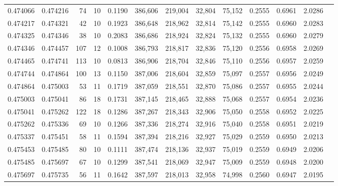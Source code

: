 \begin{tabular}{rrrrrrrrrrrrr}
0.474066 & 0.474216 &    74 &  10 &                                     0.1190 & 386,606 & 219,004 &  32,804 &  75,152 & 0.2555 & 0.6961 & 2.0286 \\
0.474217 & 0.474321 &    42 &  10 &                                     0.1923 & 386,648 & 218,962 &  32,814 &  75,142 & 0.2555 & 0.6960 & 2.0283 \\
0.474325 & 0.474346 &    38 &  10 &                                     0.2083 & 386,686 & 218,924 &  32,824 &  75,132 & 0.2555 & 0.6960 & 2.0279 \\
0.474346 & 0.474457 &   107 &  12 &                                     0.1008 & 386,793 & 218,817 &  32,836 &  75,120 & 0.2556 & 0.6958 & 2.0269 \\
0.474465 & 0.474741 &   113 &  10 &                                     0.0813 & 386,906 & 218,704 &  32,846 &  75,110 & 0.2556 & 0.6957 & 2.0259 \\
0.474744 & 0.474864 &   100 &  13 &                                     0.1150 & 387,006 & 218,604 &  32,859 &  75,097 & 0.2557 & 0.6956 & 2.0249 \\
0.474864 & 0.475003 &    53 &  11 &                                     0.1719 & 387,059 & 218,551 &  32,870 &  75,086 & 0.2557 & 0.6955 & 2.0244 \\
0.475003 & 0.475041 &    86 &  18 &                                     0.1731 & 387,145 & 218,465 &  32,888 &  75,068 & 0.2557 & 0.6954 & 2.0236 \\
0.475041 & 0.475262 &   122 &  18 &                                     0.1286 & 387,267 & 218,343 &  32,906 &  75,050 & 0.2558 & 0.6952 & 2.0225 \\
0.475262 & 0.475336 &    69 &  10 &                                     0.1266 & 387,336 & 218,274 &  32,916 &  75,040 & 0.2558 & 0.6951 & 2.0219 \\
0.475337 & 0.475451 &    58 &  11 &                                     0.1594 & 387,394 & 218,216 &  32,927 &  75,029 & 0.2559 & 0.6950 & 2.0213 \\
0.475453 & 0.475485 &    80 &  10 &                                     0.1111 & 387,474 & 218,136 &  32,937 &  75,019 & 0.2559 & 0.6949 & 2.0206 \\
0.475485 & 0.475697 &    67 &  10 &                                     0.1299 & 387,541 & 218,069 &  32,947 &  75,009 & 0.2559 & 0.6948 & 2.0200 \\
0.475697 & 0.475735 &    56 &  11 &                                     0.1642 & 387,597 & 218,013 &  32,958 &  74,998 & 0.2560 & 0.6947 & 2.0195 \\

\end{tabular}
